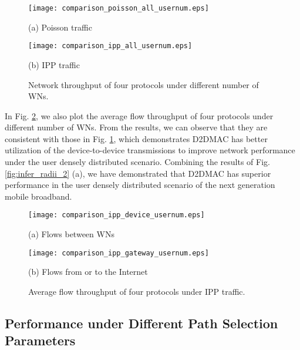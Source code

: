 \documentclass[journal]{IEEEtran}
\begin{document}
\begin{figure}[htbp]
\begin{minipage}[t]{0.5\linewidth}
\centering
\texttt{[image: comparison\_poisson\_all\_usernum.eps]}
\centerline{\small (a) Poisson traffic}
\end{minipage}\begin{minipage}[t]{0.5\linewidth}
\centering
\texttt{[image: comparison\_ipp\_all\_usernum.eps]}
\centerline{\small (b) IPP traffic}
\end{minipage}\caption{Network throughput of four protocols under different number of WNs.}
\label{fig:comparison_usernum} \vspace*{-3mm}
\end{figure}


In Fig. \ref{fig:comparison_flow_usernum}, we also plot the average flow throughput of four protocols under different number of WNs. From the results, we can observe that they are consistent with those in Fig. \ref{fig:comparison_usernum}, which demonstrates D2DMAC has better utilization of the device-to-device transmissions to improve network performance under the user densely distributed scenario. Combining the results of Fig. \ref{fig:infer_radii_2}
(a), we have demonstrated that D2DMAC has superior performance in the user densely distributed scenario of the next generation mobile broadband.




\begin{figure}[htbp]
\begin{minipage}[t]{0.5\linewidth}
\centering
\texttt{[image: comparison\_ipp\_device\_usernum.eps]}
\centerline{\small (a) Flows between WNs}
\end{minipage}\begin{minipage}[t]{0.5\linewidth}
\centering
\texttt{[image: comparison\_ipp\_gateway\_usernum.eps]}
\centerline{\small (b) Flows from or to the Internet}
\end{minipage}\caption{Average flow throughput of four protocols under IPP traffic.}
\label{fig:comparison_flow_usernum} \vspace*{-3mm}
\end{figure}






\subsection{Performance under Different Path Selection Parameters } \label{S6-2}
\end{document}
